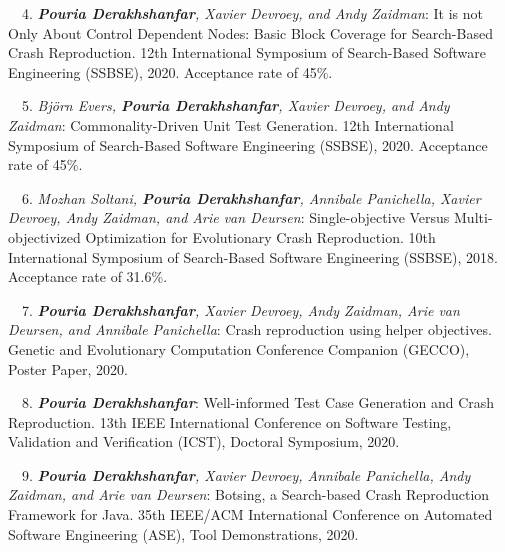 \begin{etaremune}{\small
    \item[\faFileTextO~\faTrophy~4.] \emph{\textbf{Pouria Derakhshanfar}, Xavier Devroey, and Andy Zaidman}: 
        It is not Only About Control Dependent Nodes: Basic Block Coverage for Search-Based Crash Reproduction.
        12th International Symposium of Search-Based Software Engineering (SSBSE),
        2020. Acceptance rate of 45\%.
}\end{etaremune}


\begin{etaremune}{\small
    \item[\faFileTextO~~5.] \emph{Björn Evers, \textbf{Pouria Derakhshanfar}, Xavier Devroey, and Andy Zaidman}: 
        Commonality-Driven Unit Test Generation.
        12th International Symposium of Search-Based Software Engineering (SSBSE),
        2020. Acceptance rate of 45\%.
}\end{etaremune}

\begin{etaremune}{\small
    \item[~~6.] \emph{Mozhan Soltani, \textbf{Pouria Derakhshanfar}, Annibale Panichella, Xavier Devroey, Andy Zaidman, and Arie van Deursen}: 
    Single-objective Versus Multi-objectivized Optimization for Evolutionary Crash Reproduction.
        10th International Symposium of Search-Based Software Engineering (SSBSE),
        2018. Acceptance rate of 31.6\%.
}\end{etaremune}

\begin{etaremune}{\small
    \item[~~7.] \emph{\textbf{Pouria Derakhshanfar}, Xavier Devroey,  Andy Zaidman, Arie van Deursen, and Annibale Panichella}: 
        Crash reproduction using helper objectives.
        Genetic and Evolutionary Computation Conference Companion (GECCO), Poster Paper,
        2020.
}\end{etaremune}

\begin{etaremune}{\small
    \item[\faFileTextO~~8.] \emph{\textbf{Pouria Derakhshanfar}}: 
        Well-informed Test Case Generation and Crash Reproduction.
        13th IEEE International Conference on Software Testing, Validation and Verification (ICST), Doctoral Symposium,
        2020.
}\end{etaremune}

\begin{etaremune}{\small
    \item[~~9.] \emph{\textbf{Pouria Derakhshanfar}, Xavier Devroey, Annibale Panichella, Andy Zaidman, and Arie van Deursen}: 
        Botsing, a Search-based Crash Reproduction Framework for Java.
        35th IEEE/ACM International Conference on Automated Software Engineering (ASE), Tool Demonstrations,
        2020.
}\end{etaremune}


